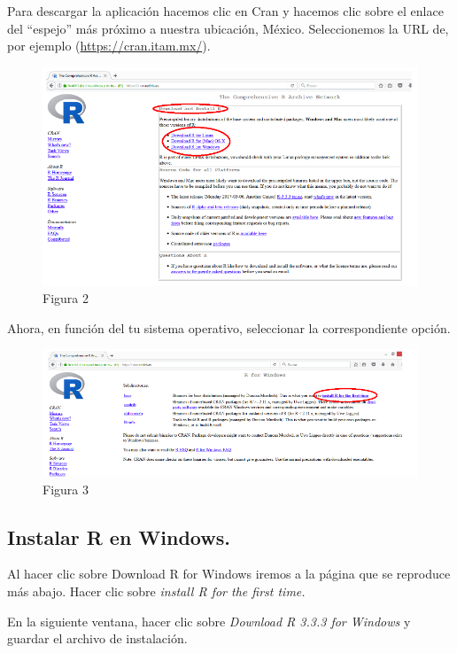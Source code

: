 \documentclass[
]{book}
\begin{document}
Para descargar la aplicación hacemos clic en Cran y hacemos clic sobre el enlace del ``espejo'' más próximo a nuestra ubicación, México. Seleccionemos la URL de, por ejemplo (\url{https://cran.itam.mx/}).

\begin{figure}
\centering
\includegraphics{imagenes/02.png}
\caption{Figura 2}
\end{figure}

Ahora, en función del tu sistema operativo, seleccionar la correspondiente opción.

\begin{figure}
\centering
\includegraphics{imagenes/03.png}
\caption{Figura 3}
\end{figure}

\hypertarget{instalar-r-en-windows.}{%
\subsection{Instalar R en Windows.}\label{instalar-r-en-windows.}}

Al hacer clic sobre Download R for Windows iremos a la página que se reproduce más abajo. Hacer clic sobre \emph{install R for the first time.}

En la siguiente ventana, hacer clic sobre \emph{Download R 3.3.3 for Windows} y guardar el archivo de instalación.
\end{document}
